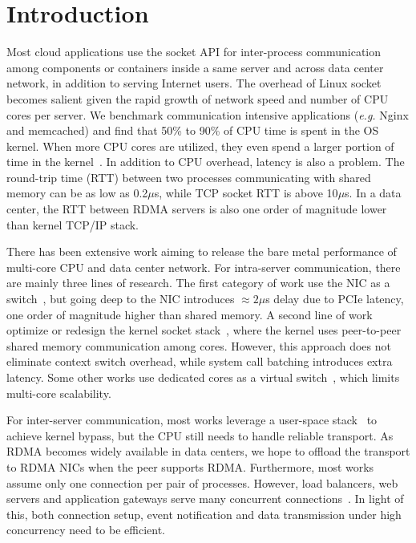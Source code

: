 \section{Introduction}
\label{sec:intro}

Most cloud applications use the socket API for inter-process communication among components or containers inside a same server and across data center network, in addition to serving Internet users. The overhead of Linux socket becomes salient given the rapid growth of network speed and number of CPU cores per server. We benchmark communication intensive applications (\textit{e.g.} Nginx and memcached) and find that 50\% to 90\% of CPU time is spent in the OS kernel. When more CPU cores are utilized, they even spend a larger portion of time in the kernel~\cite{boyd2010analysis}. In addition to CPU overhead, latency is also a problem. The round-trip time (RTT) between two processes communicating with shared memory can be as low as 0.2$\mu$s, while TCP socket RTT is above 10$\mu$s. In a data center, the RTT between RDMA servers is also one order of magnitude lower than kernel TCP/IP stack.

There has been extensive work aiming to release the bare metal performance of multi-core CPU and data center network. For intra-server communication, there are mainly three lines of research. The first category of work use the NIC as a switch~\cite{peter2016arrakis,belay2017ix,yasukata2016stackmap}, but going deep to the NIC introduces $\approx2 \mu$s delay due to PCIe latency, one order of magnitude higher than shared memory. A second line of work optimize or redesign the kernel socket stack~\cite{lin2016scalable,han2012megapipe,jeong2014mtcp,baumann2009multikernel}, where the kernel uses peer-to-peer shared memory communication among cores. However, this approach does not eliminate context switch overhead, while system call batching introduces extra latency. Some other works use dedicated cores as a virtual switch~\cite{huang2017high}, which limits multi-core scalability.

For inter-server communication, most works leverage a user-space stack~\cite{dunkels2001design,jeong2014mtcp,libvma,openonload} to achieve kernel bypass, but the CPU still needs to handle reliable transport. As RDMA becomes widely available in data centers, we hope to offload the transport to RDMA NICs when the peer supports RDMA. Furthermore, most works assume only one connection per pair of processes. However, load balancers, web servers and application gateways serve many concurrent connections~\cite{lin2016scalable}. In light of this, both connection setup, event notification and data transmission under high concurrency need to be efficient.

